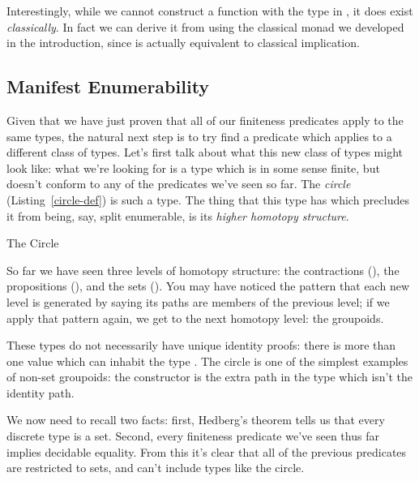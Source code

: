 Interestingly, while we cannot construct a function with the type in
, it does exist \emph{classically}.
In fact we can derive it from  using
the classical monad we developed in the introduction, since
 is actually equivalent to classical
implication.
\begin{agdalisting*}
\end{agdalisting*}
\subsection{Manifest Enumerability}\label{manifest-enumerability}
Given that we have just proven that all of our finiteness predicates apply to
the same types, the natural next step is to try find a predicate which applies
to a different class of types.
Let's first talk about what this new class of types might look like:
what we're looking for is a type which is in some sense finite, but doesn't
conform to any of the predicates we've seen so far.
The \emph{circle} (Listing~\ref{circle-def}) is such a type.
The thing that this type has which precludes it from being, say, split
enumerable, is its \emph{higher homotopy structure}.

\begin{marginagdalisting}{The Circle}\label{circle-def}
\end{marginagdalisting}


So far we have seen three levels of homotopy structure: the contractions
(), the propositions (), and the sets
().
You may have noticed the pattern that each new level is generated by saying its
paths are members of the previous level; if we apply that pattern again, we get
to the next homotopy level: the groupoids.
\begin{agdalisting}
\end{agdalisting}
These types do not necessarily have unique identity proofs: there is more than
one value which can inhabit the type .
The circle is one of the simplest examples of non-set groupoids: the constructor
 is the extra path in the type which isn't the
identity path.

We now need to recall two facts: first, Hedberg's theorem tells us that every
discrete type is a set.
Second, every finiteness predicate we've seen thus far implies decidable
equality.
From this it's clear that all of the previous predicates are restricted to sets,
and can't include types like the circle.

